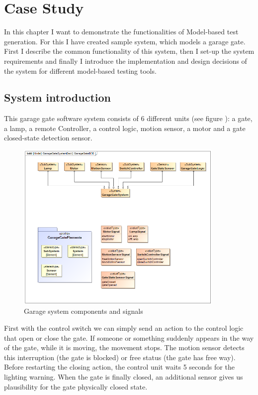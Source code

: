 \chapter{Case Study}\label{sect:case-study}
In this chapter I want to demonstrate the functionalities of Model-based test generation. For this I have created sample system, which models a garage gate. First I describe the common functionality of this system, then I set-up the system requirements and finally I introduce the implementation and design decisions of the system for different model-based testing tools.

\section{System introduction}
This garage gate software system consists of 6 different units (see figure ): a gate, a lamp, a remote Controller, a control logic, motion sensor, a motor and a gate closed-state detection sensor.

\begin{figure}[!ht]
	\centering
	\includegraphics[width=100mm, keepaspectratio]{figures/magicDraw/bdd__GarageGateBDD.png}
	\caption{Garage system components and signals}
	\label{fig:overalBDD}
\end{figure}

First with the control switch we can simply send an action to the control logic that open or close the gate. If someone or something suddenly appears in the way of the gate, while it is moving, the movement stops. The motion sensor detects this interruption (the gate is blocked) or free status (the gate has free way). Before restarting the closing action, the control unit waits 5 seconds for the lighting warning. When the gate is finally closed, an additional sensor gives us plausibility for the gate physically closed state.

